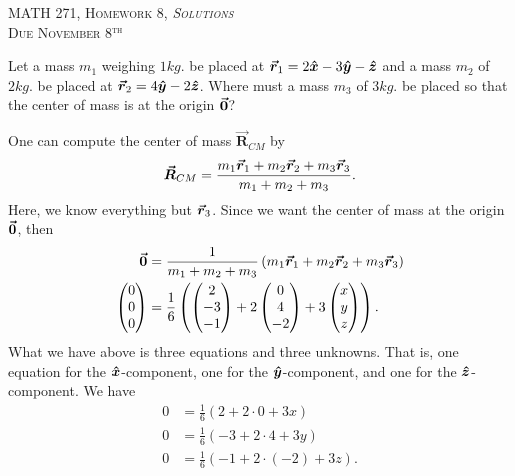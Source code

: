 \documentclass[12pt]{article} %
\begin{document}
\begin{center}
   \textsc{\large MATH 271, Homework 8, \emph{Solutions}}\\
   \textsc{Due November 8$^\textrm{th}$}
\end{center}
\vspace{.5cm}

\begin{problem}
Let a mass $m_1$ weighing $1kg.$ be placed at $\boldsymbol{\vec{r}}_1=2\boldsymbol{\hat{x}} -3 \boldsymbol{\hat{y}} -\boldsymbol{\hat{z}}$ and a mass $m_2$ of $2kg.$ be placed at $\boldsymbol{\vec{r}}_2 = 4\boldsymbol{\hat{y}} -2\boldsymbol{\hat{z}}$.  Where must a mass $m_3$ of $3kg.$ be placed so that the center of mass is at the origin $\boldsymbol{\vec{0}}$?
\end{problem}
\begin{solution}
One can compute the center of mass $\boldsymbol{\vec{R}}_{CM}$ by
\[
\boldsymbol{\vec{R}}_{CM} = \frac{m_1\boldsymbol{\vec{r}}_1 + m_2\boldsymbol{\vec{r}}_2 + m_3 \boldsymbol{\vec{r}}_3}{m_1 + m_2 + m_3}.
\]
Here, we know everything but $\boldsymbol{\vec{r}}_3$.  Since we want the center of mass at the origin $\boldsymbol{\vec{0}}$, then
\begin{align*}
\boldsymbol{\vec{0}} &= \frac{1}{m_1+m_2 + m_3} \left( m_1 \boldsymbol{\vec{r}}_1 + m_2 \boldsymbol{\vec{r}}_2 + m_3 \boldsymbol{\vec{r}}_3 \right)\\
\begin{pmatrix} 0 \\ 0 \\ 0\end{pmatrix}&= \frac{1}{6} \left( \begin{pmatrix} 2 \\ -3 \\ -1 \end{pmatrix} + 2 \begin{pmatrix} 0 \\ 4 \\ -2 \end{pmatrix} + 3 \begin{pmatrix} x \\ y \\ z \end{pmatrix}\right).
\end{align*}
What we have above is three equations and three unknowns. That is, one equation for the $\boldsymbol{\hat{x}}$-component, one for the $\boldsymbol{\hat{y}}$-component, and one for the $\boldsymbol{\hat{z}}$-component. We have
\begin{align*}
    0 & = \frac{1}{6} (2 + 2\cdot 0 + 3x)\\
    0 & = \frac{1}{6} (-3 + 2\cdot 4 + 3y)\\
    0 & = \frac{1}{6} (-1 +2\cdot (-2) + 3z).
\end{align*}

\end{solution}
\end{document}
